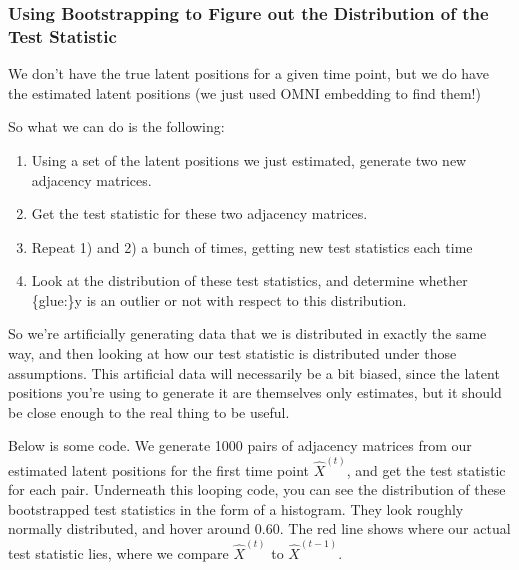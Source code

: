 \documentclass[letterpaper,10pt,english]{jupyterBook}
\begin{document}
\subsubsection{Using Bootstrapping to Figure out the Distribution of the Test Statistic}
\label{\detokenize{applications/ch10/anomaly-detection:using-bootstrapping-to-figure-out-the-distribution-of-the-test-statistic}}
\sphinxAtStartPar
We don’t have the true latent positions for a given time point, but we do have the estimated latent positions (we just used OMNI embedding to find them!)

\sphinxAtStartPar
So what we can do is the following:
\begin{enumerate}
%
\item {} 
\sphinxAtStartPar
Using a set of the latent positions we just estimated, generate two new adjacency matrices.

\item {} 
\sphinxAtStartPar
Get the test statistic for these two adjacency matrices.

\item {} 
\sphinxAtStartPar
Repeat 1) and 2) a bunch of times, getting new test statistics each time

\item {} 
\sphinxAtStartPar
Look at the distribution of these test statistics, and determine whether \{glue:\}y is an outlier or not with respect to this distribution.

\end{enumerate}

\sphinxAtStartPar
So we’re artificially generating data that we  is distributed in exactly the same way, and then looking at how our test statistic is distributed under those assumptions. This artificial data will necessarily be a bit biased, since the latent positions you’re using to generate it are themselves only estimates, but it should be close enough to the real thing to be useful.

\sphinxAtStartPar
Below is some code. We generate 1000 pairs of adjacency matrices from our estimated latent positions for the first time point \(\hat{X}^{(t)}\), and get the test statistic for each pair. Underneath this looping code, you can see the distribution of these bootstrapped test statistics in the form of a histogram. They look roughly normally distributed, and hover around 0.60. The red line shows where our actual test statistic lies, where we compare \(\hat{X}^{(t)}\) to \(\hat{X}^{(t-1)}\).
\end{document}
